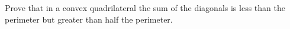 Prove that in a convex quadrilateral the sum of the diagonals is less than the perimeter but greater than half the perimeter.

